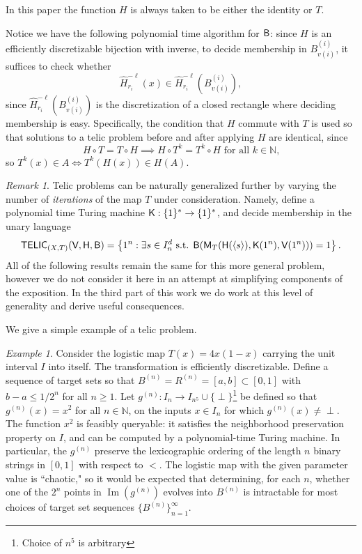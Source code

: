 \documentclass{amsart}
\theoremstyle{theorem}
\theoremstyle{remark}
\newtheorem{example}[theorem]{Example}
\newtheorem{remark}[theorem]{Remark}
\numberwithin{equation}{section}
\DeclareMathOperator{\image}{Im}
\newcommand{\NN}{\mathbb{N}}
\newcommand{\ccB}{\textsf{\upshape B}}
\newcommand{\ccH}{\textsf{\upshape H}}
\newcommand{\ccM}{\textsf{\upshape M}}
\newcommand{\ccK}{\textsf{\upshape K}}
\newcommand{\ccV}{\textsf{\upshape V}}
\newcommand{\ccTELIC}{\textsf{\upshape TELIC}}
\begin{document}
In this paper the function $H$ is always taken to be either the identity or $T$.

Notice we have the following polynomial time algorithm for $\ccB$: since $H$ is an efficiently discretizable bijection with inverse, to decide membership in $B^{(i)}_{v(i)}$, it suffices to check whether
\[\hat{H}^{-\ell}_{r_i}(x)\in \hat{H}^{-\ell}_{r_i}(B^{(i)}_{v(i)}),\]
since $\hat{H}^{-\ell}_{r_i}(B^{(i)}_{v(i)})$ is the discretization of a closed rectangle where deciding membership is easy. Specifically, the condition that $H$ commute with $T$ is used so that solutions to a telic problem before and after applying $H$ are identical, since
\[
H \circ T = T \circ H \implies H \circ T^k = T^k \circ H \text{ for all $k \in \NN$,}
\]
so $T^k(x) \in A \iff T^k(H(x)) \in H(A)$.

\begin{remark}
Telic problems can be naturally generalized further by varying the number of \emph{iterations} of the map $T$ under consideration. Namely, define a polynomial time Turing machine $\ccK:\{1\}^*\rightarrow \{1\}^*$, and decide membership in the unary language
\begin{equation*}
\ccTELIC_{(X, T)}(\ccV,\ccH,\ccB) =\left\{1^n : \exists s \in I_n^d \text{ s.t. } \ccB(\ccM_T(\ccH(\langle s\rangle), \ccK(1^n), \ccV(1^n))) = 1\right\}.
\end{equation*}
All of the following results remain the same for this more general problem, however we do not consider it here in an attempt at simplifying components of the exposition. In the third part of this work \cite{everett3} we do work at this level of generality and derive useful consequences.
\end{remark}

We give a simple example of a telic problem.

\begin{example}
Consider the logistic map $T(x) = 4x(1-x)$ carrying the unit interval $I$ into itself.
The transformation is efficiently discretizable.
Define a sequence of target sets so that $B^{(n)} = R^{(n)} = [a, b] \subset [0,1]$ with $b-a \leq 1/2^n$ for all $n \geq 1$.
Let $g^{(n)}:I_n\rightarrow I_{n^5} \cup \{\perp\}$\footnote{Choice of $n^5$ is arbitrary} be defined so that $g^{(n)}(x) = x^2$ for all $n\in \NN$, on the inputs $x \in I_n$ for which $g^{(n)}(x) \neq \perp$. The function $x^2$ is feasibly queryable: it satisfies the neighborhood preservation property on $I$, and can be computed by a polynomial-time Turing machine.
In particular, the $g^{(n)}$ preserve the lexicographic ordering of the length $n$ binary strings in $[0,1]$ with respect to $<$.
The logistic map with the given parameter value is ``chaotic," so it would be expected that determining, for each $n$, whether one of the $2^n$ points in $\image(g^{(n)})$ evolves into $B^{(n)}$ is intractable for most choices of target set sequences $\{B^{(n)}\}_{n=1}^\infty$.
\end{example}
\end{document}
